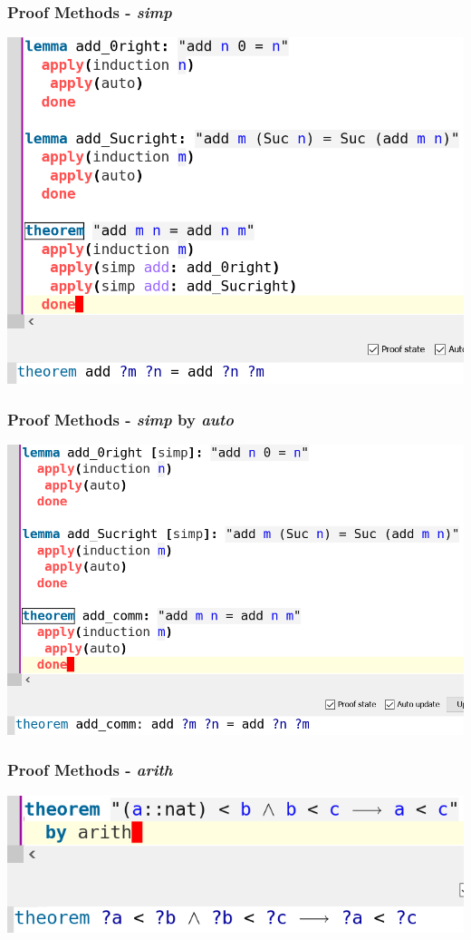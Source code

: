 \documentclass{beamer}
\begin{document}
  \begin{frame}
	\frametitle{Proof Methods - \textit{simp}}
	\centering
	\includegraphics[scale=0.6]{images/simp.png}
  \end{frame}

  \begin{frame}
	\frametitle{Proof Methods - \textit{simp} by \textit{auto}}
	\centering
	\includegraphics[scale=0.6]{images/simpbyauto.png}
  \end{frame}

  \begin{frame}
	\frametitle{Proof Methods - \textit{arith}}
	\centering
	\includegraphics[scale=0.7]{images/arith.png}
  \end{frame}
\end{document}
